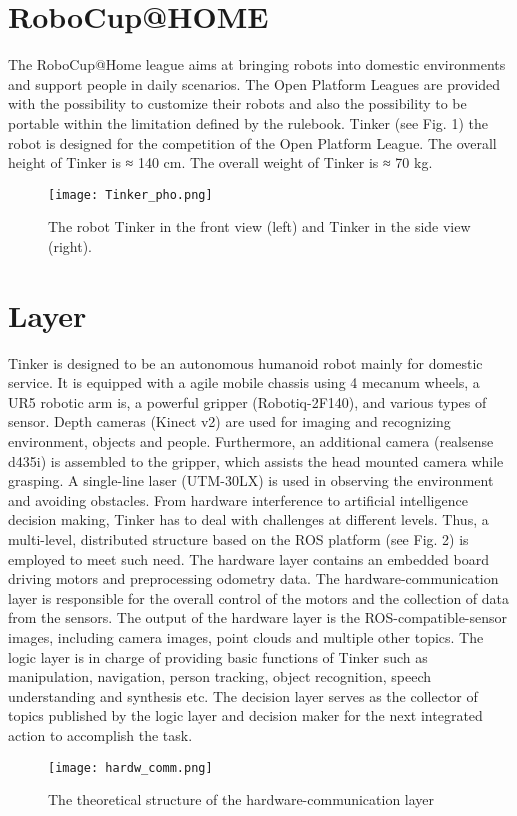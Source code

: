 \documentclass[runningheads,UTF8,fntef,a4paper]{llncs}
\begin{document}
\section{RoboCup@HOME}
The RoboCup@Home league \cite{TP-toolbox-web} aims at bringing robots into domestic environments and support people in daily scenarios.
The Open Platform Leagues are provided with the possibility to customize their robots and also the possibility to be portable within the limitation defined by the rulebook.
Tinker (see Fig. 1) the robot is designed for the competition of the Open Platform League. The overall height of Tinker is ≈ 140 cm. The overall weight of Tinker is ≈ 70 kg.
\begin{figure}[!t]
	\centering
	\texttt{[image: Tinker\_pho.png]}
	\caption{The robot Tinker in the front view (left) and Tinker in the side view (right).}
	\label{Tinker_ph}
\end{figure}
\section{Layer}
Tinker is designed to be an autonomous humanoid robot mainly for domestic service. It is equipped with a agile mobile chassis using 4 mecanum wheels, a UR5 robotic arm is, a powerful gripper (Robotiq-2F140), and various types of sensor. Depth cameras (Kinect v2) are used for imaging and recognizing environment, objects and people. Furthermore, an additional camera (realsense d435i) is assembled to the gripper, which assists the head mounted camera while grasping. A single-line laser (UTM-30LX) is used in observing the environment and avoiding obstacles.
From hardware interference to artificial intelligence decision making, Tinker has to deal with challenges at diﬀerent levels. Thus, a multi-level, distributed structure based on the ROS platform  (see Fig. 2) is employed to meet such need. The hardware layer contains an embedded board driving motors and preprocessing odometry data. The hardware-communication layer is responsible for the overall control of the motors and the collection of data from the sensors. The output of the hardware layer is the ROS-compatible-sensor images, including camera images, point clouds and multiple other topics. The logic layer is in charge of providing basic functions of Tinker such as manipulation, navigation, person tracking, object recognition, speech understanding and synthesis etc. The decision layer serves as the collector of topics published by the logic layer and decision maker for the next integrated action to accomplish the task.
\begin{figure}[!t]
	\centering
	\texttt{[image: hardw\_comm.png]}
	\caption{The theoretical structure of the hardware-communication layer}
	\label{har_com}
\end{figure}
\end{document}
